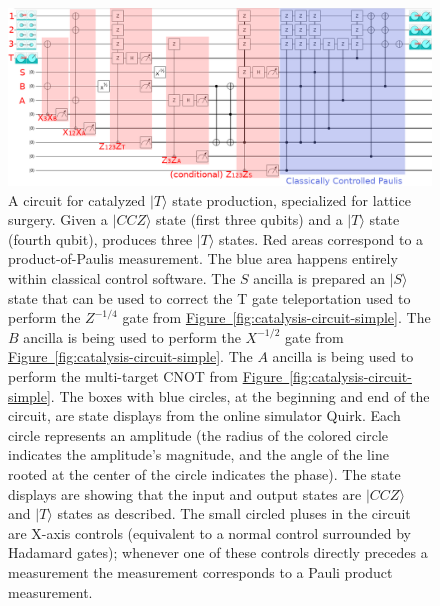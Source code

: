 \documentclass[superscriptaddress,notitlepage,longbibliography]{revtex4-1}
\newcommand{\fig}[1]{\hyperref[fig:#1]{Figure~\ref*{fig:#1}}}
\begin{document}
\begin{figure}[ht]
    \label{fig:catalysis-circuit}
    \centering
    \includegraphics[width=\textwidth,height=\dimexpr\textheight-11\baselineskip,keepaspectratio]{catalysis-circuit.png}
    \caption{
      A circuit for catalyzed $|T\rangle$ state production, specialized for lattice surgery.
      Given a $|CCZ\rangle$ state (first three qubits) and a $|T\rangle$ state (fourth qubit), produces three $|T\rangle$ states.
      Red areas correspond to a product-of-Paulis measurement.
      The blue area happens entirely within classical control software.
      The $S$ ancilla is prepared an $|S\rangle$ state that can be used to correct the T gate teleportation used to perform the $Z^{-1/4}$ gate from \fig{catalysis-circuit-simple}.
      The $B$ ancilla is being used to perform the $X^{-1/2}$ gate from \fig{catalysis-circuit-simple}.
      The $A$ ancilla is being used to perform the multi-target CNOT from \fig{catalysis-circuit-simple}.
      The boxes with blue circles, at the beginning and end of the circuit, are state displays from the online simulator Quirk.
      Each circle represents an amplitude (the radius of the colored circle indicates the amplitude's magnitude, and the angle of the line rooted at the center of the circle indicates the phase).
      The state displays are showing that the input and output states are $|CCZ\rangle$ and $|T\rangle$ states as described.
      The small circled pluses in the circuit are X-axis controls (equivalent to a normal control surrounded by Hadamard gates); whenever one of these controls directly precedes a measurement the measurement corresponds to a Pauli product measurement.
}
\end{figure}
\end{document}
